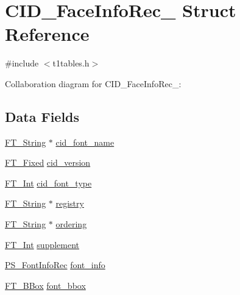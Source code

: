 \hypertarget{struct_c_i_d___face_info_rec__}{}\section{C\+I\+D\+\_\+\+Face\+Info\+Rec\+\_\+ Struct Reference}
\label{struct_c_i_d___face_info_rec__}


{\ttfamily \#include $<$t1tables.\+h$>$}



Collaboration diagram for C\+I\+D\+\_\+\+Face\+Info\+Rec\+\_\+\+:
\subsection*{Data Fields}
\begin{DoxyCompactItemize}
\item 
\hyperlink{fttypes_8h_a9846214585359eb2ba6bbb0e6de30639}{F\+T\+\_\+\+String} $\ast$ \hyperlink{struct_c_i_d___face_info_rec___a804ff6d8a672236f258bfe7baf20867a}{cid\+\_\+font\+\_\+name}
\item 
\hyperlink{fttypes_8h_a5f5a679cc09f758efdd0d1c5feed3c3d}{F\+T\+\_\+\+Fixed} \hyperlink{struct_c_i_d___face_info_rec___af37ddd46827a8e45fbcce60f43e2f61c}{cid\+\_\+version}
\item 
\hyperlink{fttypes_8h_af90e5fb0d07e21be9fe6faa33f02484c}{F\+T\+\_\+\+Int} \hyperlink{struct_c_i_d___face_info_rec___a83ce2384925f2fec44a823cf635abe8c}{cid\+\_\+font\+\_\+type}
\item 
\hyperlink{fttypes_8h_a9846214585359eb2ba6bbb0e6de30639}{F\+T\+\_\+\+String} $\ast$ \hyperlink{struct_c_i_d___face_info_rec___a7f553f371d2c960b4c46876f748f5c0d}{registry}
\item 
\hyperlink{fttypes_8h_a9846214585359eb2ba6bbb0e6de30639}{F\+T\+\_\+\+String} $\ast$ \hyperlink{struct_c_i_d___face_info_rec___acbc231cd616375331c2c1a7bb31b2f87}{ordering}
\item 
\hyperlink{fttypes_8h_af90e5fb0d07e21be9fe6faa33f02484c}{F\+T\+\_\+\+Int} \hyperlink{struct_c_i_d___face_info_rec___a6d35a867d12ca9cfa6ab06cf329d0354}{supplement}
\item 
\hyperlink{t1tables_8h_aea24b6bd1ce2570170c42cfd8718895e}{P\+S\+\_\+\+Font\+Info\+Rec} \hyperlink{struct_c_i_d___face_info_rec___ab7a975d269f3d2bd16554d2c3c1ba05f}{font\+\_\+info}
\item 
\hyperlink{ftimage_8h_ae341c4eb5a7199947a13b2a1dcaf7af7}{F\+T\+\_\+\+B\+Box} \hyperlink{struct_c_i_d___face_info_rec___a48fe4e9246535f547241028cbf8d8b41}{font\+\_\+bbox}

\end{DoxyCompactItemize}
